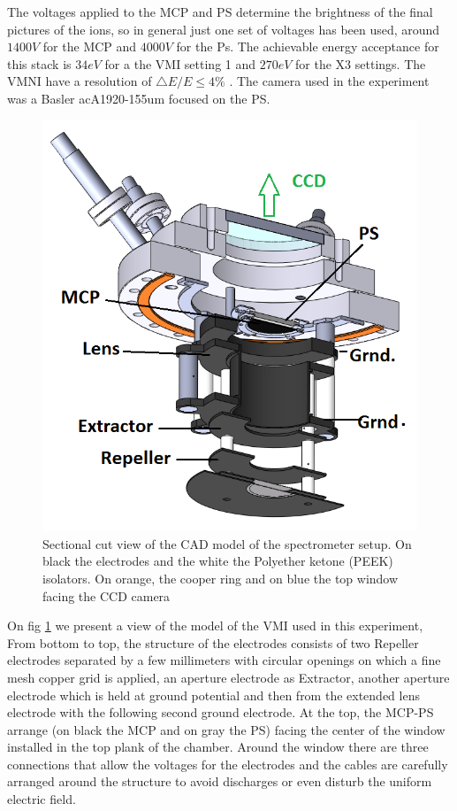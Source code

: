 The voltages applied to the MCP and PS determine the brightness of the final pictures of the ions, so in general just one set of voltages has been used, around $1400V$ for the MCP and $4000V$ for the Ps. The achievable energy acceptance for this stack is  $34eV$ for a the VMI setting 1 and $270 eV$ for the X3 settings. The VMNI have a resolution of $\bigtriangleup E / E\leq 4\%$ \cite{schomas_compact_2017}. The camera used in the experiment was a Basler  acA1920-155um focused on the PS.

\begin{figure}[hbtp]
\label{img:mcp cut}
\centering
\includegraphics[width =10 cm]{../Images/MCP cut.png}
\caption[MCP sketch cut]{Sectional cut view of the CAD model of the spectrometer setup. On black  the electrodes and the white the Polyether ketone (PEEK) isolators. On orange, the cooper ring and on blue the top window facing the CCD camera
}
\end{figure}

On fig \ref{img:mcp cut} we present a view of the model of the VMI used in this experiment, From bottom to top, the structure of the electrodes consists of two Repeller electrodes separated by a few millimeters with circular openings on which a fine mesh copper grid is applied, an aperture electrode as Extractor, another aperture electrode which is held at ground potential and then from the extended lens electrode with the following second ground electrode. At the top,  the MCP-PS arrange (on black the MCP and on gray the PS) facing the center of the window installed in the top plank of the chamber. Around the window there are three connections that allow the voltages for the electrodes and the cables are carefully arranged around the structure to avoid discharges or even disturb the uniform electric field.

